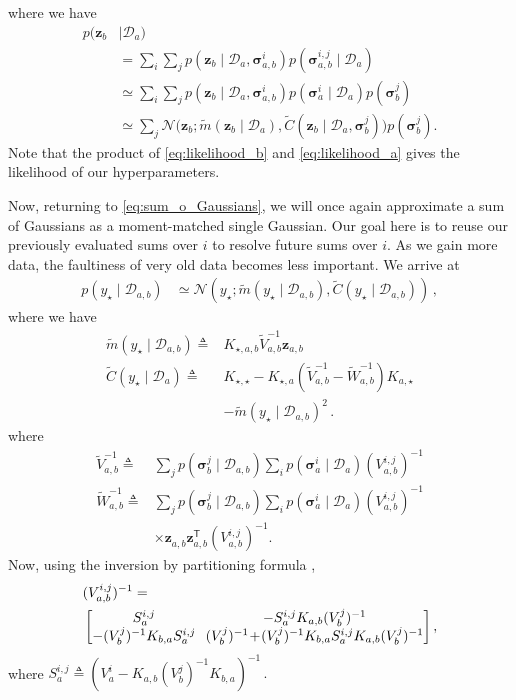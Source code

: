 \documentclass{article}
\newcommand{\given}{\ensuremath{\mid}}
\newcommand{\cm}[1]{\ensuremath{\mathcal{#1}}}
\newcommand{\bm}[1]{\ensuremath{\mathbf{#1}}}
\newcommand{\data}{\ensuremath{\cm{D}}}
\newcommand{\vect}[1]{\bm{#1}}
\newcommand{\vz}{\vect{z}}
\newcommand{\vs}{\vect{\sigma}}
\newcommand{\amean}[2]{\tilde{{m}}(#1 \given #2 )}
\newcommand{\acov}[2]{\tilde{{C}}(#1 \given #2 )}
\newcommand{\p}[2]{p(#1 \given #2 )}
\newcommand{\fPr}{p}
\newcommand{\Prob}[2]{\fPr(#1 \given #2 )}
\newcommand{\N}[3]{\cm{N}( #1;#2,#3 )}
\newcommand{\st}{_{\star}}
\newcommand{\tr}{\ensuremath{\mathsf{T}}}
\newcommand{\defequal}{\triangleq}
\begin{document}
where we have
\begin{align}
p(\vz_{b} &\given \data_a)\nonumber\\
& = \sum_i \sum_j \p{\vz_b}{\data_a,\vs^i_{a,b}}\Prob{\vs^{i,j}_{a,b}}{\data_a}\nonumber\\
& \simeq \sum_i \sum_j \p{\vz_b}{\data_a,\vs^i_{a,b}}\Prob{\vs_a^i}{\data_a}\fPr(\vs_{b}^j)\nonumber\\
& \simeq \sum_j \cm{N}\bigl(\vz_b; \amean{\vz_b}{\data_a}, \acov{\vz_b}{\data_a, \vs_b^j}\bigr) \fPr(\vs_b^j).\label{eq:likelihood_b}
\end{align}
Note that the product of \eqref{eq:likelihood_b} and
\eqref{eq:likelihood_a} gives the likelihood of our hyperparameters.

Now, returning to \eqref{eq:sum_o_Gaussians}, we will once again
approximate a sum of Gaussians as a moment-matched single
Gaussian. Our goal here is to reuse our previously evaluated sums over
$i$ to resolve future sums over $i$. As we gain more data, the
faultiness of very old data becomes less important. We arrive at
\begin{align}
\p{y\st}{\data_{a,b}} & \simeq \N{y\st}{\amean{y\st}{\data_{a,b}}}{\acov{y\st}{\data_{a,b}}}\,,\label{eq:pyab}
\end{align}
where we have
\begin{align*}
\amean{y\st}{\data_{a,b}} \defequal {}&  K_{\star,a,b} \tilde{V}_{a,b}^{-1} \vz_{a,b}%
\\
\acov{y\st}{\data_{a}}
\defequal {} & K_{\star,\star} - K_{\star,a}(\tilde{V}_{a,b}^{-1}-\tilde{W}_{a,b}^{-1})K_{a,\star} {} \nonumber
\\
& - \amean{y\st}{\data_{a,b}}^2 \,.%
\end{align*}
where
\begin{align*}
\tilde{V}^{-1}_{a,b} \defequal {} &
\sum_{j} \Prob{\vs^j_{b}}{\data_{a,b}}\sum_i \Prob{\vs^i_{a}}{\data_{a}} (V_{a,b}^{i,j})^{-1} \\
\tilde{W}^{-1}_{a,b} \defequal {} &
\sum_{j} \Prob{\vs^j_{b}}{\data_{a,b}}\sum_i \Prob{\vs^i_{a}}{\data_{a}} (V_{a,b}^{i,j})^{-1}  
\\
& \times \vz_{a,b}^{\phantom{\tr}} \vz_{a,b}^\tr (V_{a,b}^{i,j})^{-1}.
\end{align*}
Now, using the inversion by partitioning formula \citep[Section 2.7]
{NumericalRecipes},
\begin{align*}
\hspace{-0.2cm}&({V}^{i,j}_{a,b})^{-1} = \\
&\begin{bmatrix}
 S^{i,j}_a &\hspace{-0.1cm} -S^{i,j}_a K_{a,b} (V^j_b)^{-1} \\
 - (V^j_b)^{-1} K_{b,a} S^{i,j}_a &\hspace{-0.1cm} (V^j_b)^{-1}\!+\!(V^j_b)^{-1} K_{b,a} S^{i,j}_a K_{a,b} (V^j_b)^{-1} 
\end{bmatrix},
\end{align*}
where
$
S^{i,j}_a \defequal (V^i_a -K_{a,b} (V^j_b)^{-1}K_{b,a})^{-1}\,.
$
\end{document}
